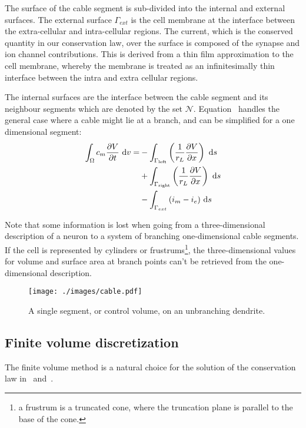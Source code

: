 The surface of the cable segment is sub-divided into the internal and external surfaces.
The external surface $\Gamma_{ext}$ is the cell membrane at the interface between the extra-cellular and intra-cellular regions.
The current, which is the conserved quantity in our conservation law, over the surface is composed of the synapse and ion channel contributions.
This is derived from a thin film approximation to the cell membrane, whereby the membrane is treated as an infinitesimally thin interface between the intra and extra cellular regions.

The internal surfaces are the interface between the cable segment and its neighbour segments which are denoted by the set $\mathcal N$.
Equation~ handles the general case where a cable might lie at a branch, and can be simplified for a one dimensional segment:
\begin{align}
    \int_{\Omega}{c_m \frac{\partial{V}}{\partial{t}} } ~\text{d}{v} =
        & - \int_{\Gamma_{\text{left}}}  \left( \frac{1}{r_L}\frac{\partial{V}}{\partial{x}} \right) ~\text{d}{s} \nonumber \\
        & + \int_{\Gamma_{\text{right}}} \left( \frac{1}{r_L}\frac{\partial{V}}{\partial{x}} \right) ~\text{d}{s} \nonumber \\
        & - \int_{\Gamma_{ext}} {(i_m - i_e)} ~\text{d}{s}
    \label{eq:cable_balance_1D}
\end{align}

Note that some information is lost when going from a three-dimensional description of a neuron to a system of branching one-dimensional cable segments.
If the cell is represented by cylinders or frustrums\footnote{a frustrum is a truncated cone, where the truncation plane is parallel to the base of the cone.}, the three-dimensional values for volume and surface area at branch points can't be retrieved from the one-dimensional description.

\begin{figure}
    \begin{center}
        \texttt{[image: ./images/cable.pdf]}
    \end{center}
    \caption{A single segment, or control volume, on an unbranching dendrite.}
    \label{fig:segment}
\end{figure}

\subsection{Finite volume discretization}
The finite volume method is a natural choice for the solution of the conservation law in~ and~.

